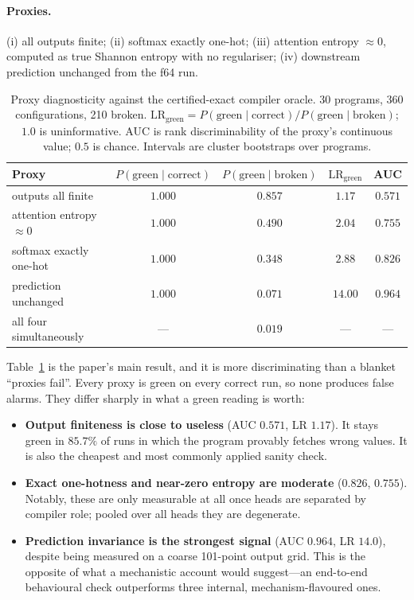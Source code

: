 \documentclass{article}
\theoremstyle{definition}
\begin{document}
\paragraph{Proxies.} (i) all outputs finite; (ii) softmax exactly one-hot;
(iii) attention entropy $\approx0$, computed as true Shannon entropy with no
regulariser; (iv) downstream prediction unchanged from the f64 run.

\begin{table}[t]
\caption{Proxy diagnosticity against the certified-exact compiler oracle. 30
programs, 360 configurations, 210 broken. $\mathrm{LR}_{\text{green}}
= P(\text{green}\mid\text{correct})/P(\text{green}\mid\text{broken})$; $1.0$ is
uninformative. AUC is rank discriminability of the proxy's continuous value;
$0.5$ is chance. Intervals are cluster bootstraps over programs.}
\label{tab:proxies}
\begin{center}
\begin{tabular}{lcccc}
\toprule
Proxy & $P(\text{green}\mid\text{correct})$ & $P(\text{green}\mid\text{broken})$
& $\mathrm{LR}_{\text{green}}$ & AUC \\
\midrule
outputs all finite       & $1.000$ & $0.857$ & $1.17$  & $0.571$ \\
attention entropy $\approx 0$ & $1.000$ & $0.490$ & $2.04$  & $0.755$ \\
softmax exactly one-hot  & $1.000$ & $0.348$ & $2.88$  & $0.826$ \\
prediction unchanged     & $1.000$ & $0.071$ & $14.00$ & $\mathbf{0.964}$ \\
\midrule
all four simultaneously  & --- & $0.019$ & --- & --- \\
\bottomrule
\end{tabular}
\end{center}
\end{table}

Table~\ref{tab:proxies} is the paper's main result, and it is more discriminating
than a blanket ``proxies fail''. Every proxy is green on every correct run, so
none produces false alarms. They differ sharply in what a green reading is worth:

\begin{itemize}
\item \textbf{Output finiteness is close to useless} (AUC $0.571$, LR $1.17$). It
stays green in $85.7\%$ of runs in which the program provably fetches wrong
values. It is also the cheapest and most commonly applied sanity check.

\item \textbf{Exact one-hotness and near-zero entropy are moderate}
($0.826$, $0.755$). Notably, these are only measurable at all once heads are
separated by compiler role; pooled over all heads they are degenerate.

\item \textbf{Prediction invariance is the strongest signal} (AUC $0.964$,
LR $14.0$), despite being measured on a coarse 101-point output grid. This is the
opposite of what a mechanistic account would suggest---an end-to-end behavioural
check outperforms three internal, mechanism-flavoured ones.
\end{itemize}
\end{document}
